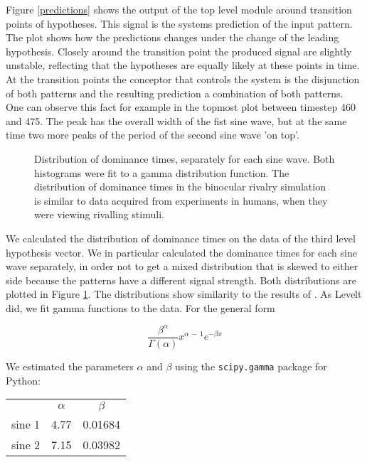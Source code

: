 \documentclass[utf8]{frontiersSCNS} %
\begin{document}
    
    Figure \ref{predictions} shows the output of the top level module around transition points of hypotheses. 
    This signal is the systems prediction of the input pattern. The plot shows how the predictions changes under the change of the leading hypothesis. 
    Closely around the transition point the produced signal are slightly unstable, reflecting that the hypotheses are equally likely at these points in time. 
    At the transition points the conceptor that controls the system is the disjunction of both 
    patterns and the resulting prediction a combination of both patterns. One can observe this fact for 
    example in the topmost plot between timestep 460 and 475. The peak has the overall width of the fist sine wave, but at the same time 
    two more peaks of the period of the second sine wave 'on top'.
	
    \begin{figure}
           	\centering
       	    
      	\caption[Distribution of dominance times]{Distribution of dominance times, separately for each sine wave. Both histograms were fit to a gamma distribution function. The distribution of dominance times in the binocular rivalry simulation is similar to data acquired from experiments in humans, when they were viewing rivalling stimuli.}
       	\label{dominance_times}
    \end{figure}
    
    We calculated the distribution of dominance times on the data of the third level hypothesis vector. We in particular calculated the dominance times for each sine wave separately, in order not to get a mixed distribution that is skewed to either side because the patterns have a different signal strength. Both distributions are plotted in Figure \ref{dominance_times}. The distributions show similarity to the results of \cite{Levelt1965}. As Levelt did, we fit gamma functions to the data. For the general form 
    
    
    \begin{equation}
{\frac {\beta ^{\alpha }}{\Gamma (\alpha )}}x^{\alpha \,-\,1}e^{-\beta x}
    \end{equation}
    
    We estimated the parameters $\alpha$ and $\beta$ using the \texttt{scipy.gamma} package for Python:



	\begin{center}
    \begin{tabular}{ r|c|c| }
    \multicolumn{1}{r}{}
     &  \multicolumn{1}{c}{$\alpha$}
     & \multicolumn{1}{c}{$\beta$} \\
    \cline{2-3}
    sine 1 & 4.77 & 0.01684 \\
    \cline{2-3}
    sine 2 & 7.15 & 0.03982 \\
    \cline{2-3}
    \end{tabular}
    \end{center}
\end{document}
